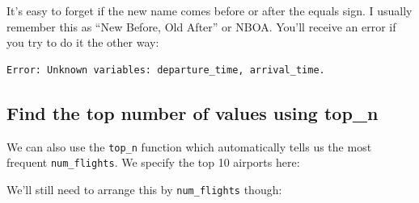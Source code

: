 \documentclass[]{tufte-book}
\newenvironment{Shaded}{\begin{snugshade}}{\end{snugshade}}
\newcommand{\KeywordTok}[1]{\textcolor[rgb]{0.13,0.29,0.53}{\textbf{{#1}}}}
\newcommand{\DataTypeTok}[1]{\textcolor[rgb]{0.13,0.29,0.53}{{#1}}}
\newcommand{\DecValTok}[1]{\textcolor[rgb]{0.00,0.00,0.81}{{#1}}}
\newcommand{\StringTok}[1]{\textcolor[rgb]{0.31,0.60,0.02}{{#1}}}
\newcommand{\NormalTok}[1]{{#1}}
\theoremstyle{definition}
\theoremstyle{definition}
\theoremstyle{remark}
\begin{document}
\begin{Shaded}
\end{Shaded}

It's easy to forget if the new name comes before or after the equals
sign. I usually remember this as ``New Before, Old After'' or NBOA.
You'll receive an error if you try to do it the other way:

\begin{verbatim}
Error: Unknown variables: departure_time, arrival_time.
\end{verbatim}

\subsection{Find the top number of values using
top\_n}\label{find-the-top-number-of-values-using-top_n}

We can also use the \texttt{top\_n} function which automatically tells
us the most frequent \texttt{num\_flights}. We specify the top 10
airports here:

\begin{Shaded}
\end{Shaded}

We'll still need to arrange this by \texttt{num\_flights} though:

\begin{Shaded}
\end{Shaded}
\end{document}
